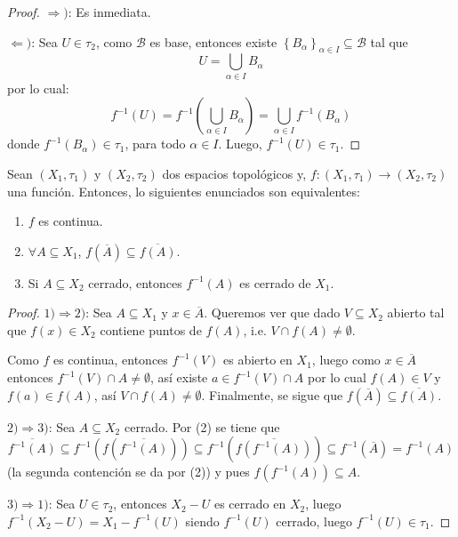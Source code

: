 \documentclass[12pt]{report}
\theoremstyle{largebreak}
\newcommand\cf[3]{\ensuremath{#1:#2\rightarrow#3}}
\newcommand{\Cls}[1]{\ensuremath{\overline{#1}}}
\begin{document}
    \begin{proof}
        $\Rightarrow)$: Es inmediata.

        $\Leftarrow)$: Sea $U\in\tau_2$, como $\mathcal{B}$ es base, entonces existe $\left\{B_\alpha \right\}_{\alpha\in I}\subseteq\mathcal{B}$ tal que
        \begin{equation*}
            U=\bigcup_{\alpha\in I}B_\alpha
        \end{equation*}
        por lo cual:
        \begin{equation*}
            f^{-1}(U)=f^{-1}\left(\bigcup_{\alpha\in I}B_\alpha\right)=\bigcup_{\alpha\in I}f^{-1}(B_\alpha)
        \end{equation*}
        donde $f^{-1}(B_\alpha)\in\tau_1$, para todo $\alpha\in I$. Luego, $f^{-1}(U)\in\tau_1$.
    \end{proof}

    \begin{propo}
        Sean $(X_1,\tau_1)$ y $(X_2,\tau_2)$ dos espacios topológicos y, $\cf{f}{(X_1,\tau_1)}{(X_2,\tau_2)}$ una función. Entonces, lo siguientes enunciados son equivalentes:
        \begin{enumerate}
            \item $f$ es continua.
            \item $\forall A\subseteq X_1$, $f(\Cls{A})\subseteq\Cls{f(A)}$.
            \item Si $A\subseteq X_2$ cerrado, entonces $f^{-1}(A)$ es cerrado de $X_1$. 
        \end{enumerate}
        
        \begin{proof}
            $1)\Rightarrow 2)$: Sea $A\subseteq X_1$ y $x\in \Cls{A}$. Queremos ver que dado $V\subseteq X_2$ abierto tal que $f(x)\in X_2$ contiene puntos de $f(A)$, i.e. $V\cap f(A)\neq\emptyset$.
            
            Como $f$ es continua, entonces $f^{-1}(V)$ es abierto en $X_1$, luego como $x\in\Cls{A}$ entonces $f^{-1}(V)\cap A\neq\emptyset$, así existe $a\in f^{-1}(V)\cap A$ por lo cual $f(A)\in V$ y $f(a)\in f(A)$, así $V\cap f(A)\neq\emptyset$. Finalmente, se sigue que $f(\Cls{A})\subseteq\Cls{f(A)}$.

            $2)\Rightarrow 3)$: Sea $A\subseteq X_2$ cerrado. Por (2) se tiene que
            \begin{equation*}
                \Cls{f^{-1}(A)}\subseteq f^{-1}(f(\Cls{f^{-1}(A)}))\subseteq f^{-1}(\Cls{f(f^{-1}(A))})\subseteq f^{-1}(\Cls{A})=f^{-1}(A)
            \end{equation*}
            (la segunda contención se da por (2)) y pues $f(f^{-1}(A))\subseteq A$.
            
            $3)\Rightarrow 1)$: Sea $U\in\tau_2$, entonces $X_2-U$ es cerrado en $X_2$, luego $f^{-1}(X_2-U)=X_1-f^{-1}(U)$ siendo $f^{-1}(U)$ cerrado, luego $f^{-1}(U)\in\tau_1$.
        \end{proof}
    \end{propo}
\end{document}

